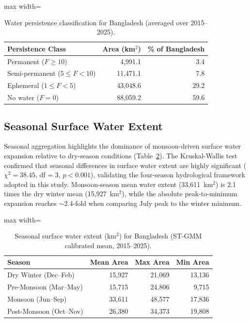 \documentclass[fleqn,10pt,twocolumn]{article}
\begin{document}
\begin{table}[htbp]
\centering
\caption{Water persistence classification for Bangladesh (averaged over 2015--2025).}
\label{tab:persistence}
\begin{adjustbox}{max width=\linewidth}\begin{tabular}{lrr}
\toprule
\textbf{Persistence Class} & \textbf{Area (km$^{2}$)} & \textbf{\% of Bangladesh} \\
\midrule
Permanent ($F \geq 10$)         & 4,991.1 & 3.4 \\
Semi-permanent ($5 \leq F < 10$) & 11,471.1  & 7.8  \\
Ephemeral ($1 \leq F < 5$)      & 43,048.6 & 29.2 \\
No water ($F = 0$)              & 88,059.2 & 59.6 \\
\bottomrule
\end{tabular}\end{adjustbox}
\end{table}



\subsection{Seasonal Surface Water Extent}

Seasonal aggregation highlights the dominance of monsoon-driven surface water expansion relative to dry-season conditions (Table~\ref{tab:seasonal}). The Kruskal-Wallis test confirmed that seasonal differences in surface water extent are highly significant ($\chi^2 = 38.45$, df = 3, $p < 0.001$), validating the four-season hydrological framework adopted in this study. Monsoon-season mean water extent (33,611~km$^2$) is 2.1 times the dry winter mean (15,927~km$^2$), while the absolute peak-to-minimum expansion reaches $\sim$2.4-fold when comparing July peak to the winter minimum.

\begin{table}[htbp]
\centering
\caption{Seasonal surface water extent (km$^{2}$) for Bangladesh (ST-GMM calibrated mean, 2015--2025).}
\label{tab:seasonal}
\begin{adjustbox}{max width=\linewidth}\begin{tabular}{lrrr}
\toprule
\textbf{Season} & \textbf{Mean Area} & \textbf{Max Area} & \textbf{Min Area} \\
\midrule
Dry Winter (Dec--Feb)     & 15,927 & 21,069 & 13,136 \\
Pre-Monsoon (Mar--May)    & 15,715 & 24,806 & 9,715 \\
Monsoon (Jun--Sep)        & 33,611 & 48,577 & 17,836 \\
Post-Monsoon (Oct--Nov)   & 26,380 & 34,373 & 19,808 \\
\bottomrule
\end{tabular}\end{adjustbox}
\end{table}
\end{document}
